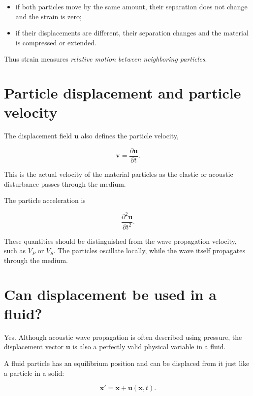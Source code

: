 \documentclass[11pt]{article}
\begin{document}
\begin{itemize}
    \item if both particles move by the same amount, their separation does not change and the strain is zero;
    \item if their displacements are different, their separation changes and the material is compressed or extended.
\end{itemize}

Thus strain measures \emph{relative motion between neighboring particles}.

\section{Particle displacement and particle velocity}

The displacement field $\bm{u}$ also defines the particle velocity,

\begin{equation}
    \boxed{
    \bm{v}
    =
    \frac{\partial \bm{u}}{\partial t}.
    }
\end{equation}

This is the actual velocity of the material particles as the elastic or acoustic disturbance passes through the medium.

The particle acceleration is

\begin{equation}
    \frac{\partial^2\bm{u}}{\partial t^2}.
\end{equation}

These quantities should be distinguished from the wave propagation velocity, such as $V_P$ or $V_S$. The particles oscillate locally, while the wave itself propagates through the medium.

\section{Can displacement be used in a fluid?}

Yes. Although acoustic wave propagation is often described using pressure, the displacement vector $\bm{u}$ is also a perfectly valid physical variable in a fluid.

A fluid particle has an equilibrium position and can be displaced from it just like a particle in a solid:

\begin{equation}
    \bm{x}'=\bm{x}+\bm{u}(\bm{x},t).
\end{equation}
\end{document}
